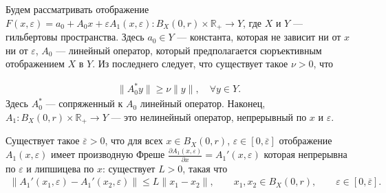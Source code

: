 \documentclass[../main.tex]{subfiles}
\begin{document}
Будем рассматривать отображение $F(x, \varepsilon) = a_0 + A_0x + \varepsilon A_1(x,\varepsilon): B_X(0, r) \times \mathbb{R}_+ \rightarrow Y$, где $X$ и $Y$ --- гильбертовы пространства.
Здесь $a_0 \in Y$ --- константа, которая не зависит ни от $x$ ни от $\varepsilon$, $A_0$ --- линейный оператор, который предполагается сюръективным отображением $X$ в $Y$. 
Из последнего следует, что существует такое $\nu > 0$, что

\begin{gather}\label{regular}
    \| A_0^*y\| \geqslant \nu \|y\|, \quad \forall y \in Y.
\end{gather}
Здесь $A_0^* $ --- сопряженный к $A_0$ линейный оператор.
Наконец,  $A_1: B_X(0, r) \times \mathbb{R}_+ \to Y $ --- это нелинейный оператор, непрерывный по $x$ и $\varepsilon$.
\begin{assumption}\label{as:derivative_of_A1}
    Существует такое $\overline{\varepsilon} > 0$, что для всех $x \in B_X(0,r)$, $\varepsilon \in [0, \overline{\varepsilon}]$ отображение $A_1(x, \varepsilon)$  имеет производную Фреше $\frac{\partial A_1(x, \varepsilon)}{\partial x} = A_1'(x, \varepsilon)$  которая непрерывна по $\varepsilon$ и липшицева по $x$: существует $L>0$, такая что
    \begin{gather*}
        \|A_1'(x_1,\varepsilon) - A_1'(x_2,\varepsilon) \| \leqslant L\|x_1-x_2\|, \qquad x_1, x_2 \in B_X(0,r), \qquad \varepsilon \in [0, \overline{\varepsilon}].
    \end{gather*}
\end{assumption}
\end{document}
